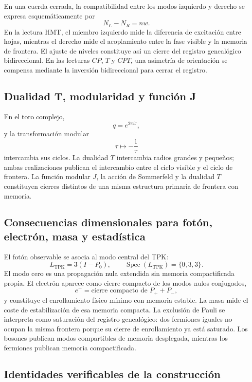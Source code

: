 En una cuerda cerrada, la compatibilidad entre los modos izquierdo y derecho
se expresa esquemáticamente por
\[
N_L-N_R=nw.
\]
En la lectura HMT, el miembro izquierdo mide la diferencia de excitación
entre hojas, mientras el derecho mide el acoplamiento entre la fase visible y
la memoria de frontera. El ajuste de niveles constituye así un cierre del
registro genealógico bidireccional. En las lecturas \(CP\), \(T\) y \(CPT\), una asimetría
de orientación se compensa mediante la inversión bidireccional para cerrar el
registro.

\subsection{Dualidad T, modularidad y función J}

En el toro complejo,
\[
q=e^{2\pi i\tau},
\]
y la transformación modular
\[
\tau\longmapsto-\frac1\tau
\]
intercambia sus ciclos. La dualidad \(T\) intercambia radios grandes y
pequeños; ambas realizaciones publican el intercambio entre el ciclo visible
y el ciclo de frontera. La función modular \(J\), la acción de
Sommerfeld y la dualidad \(T\) constituyen cierres distintos de una misma
estructura primaria de frontera con memoria.

\subsection{Consecuencias dimensionales para fotón, electrón, masa y estadística}

El fotón observable se asocia al modo central del TPK:
\[
L_{\mathrm{TPK}}=3(I-P_0),
\qquad
\operatorname{Spec}(L_{\mathrm{TPK}})=\{0,3,3\}.
\]
El modo cero es una propagación nula extendida sin memoria compactificada
propia. El electrón aparece como cierre compacto de los modos nulos
conjugados,
\[
e^-=\text{cierre compacto de }P_++P_-,
\]
y constituye el enrollamiento físico mínimo con memoria estable. La masa
mide el coste de estabilización de esa memoria compacta. La exclusión de
Pauli se interpreta como saturación del registro genealógico: dos fermiones iguales no
ocupan la misma frontera porque su cierre de enrollamiento ya está saturado.
Los bosones publican modos compartibles de memoria desplegada, mientras los
fermiones publican memoria compactificada.

\subsection{Identidades verificables de la construcción}

